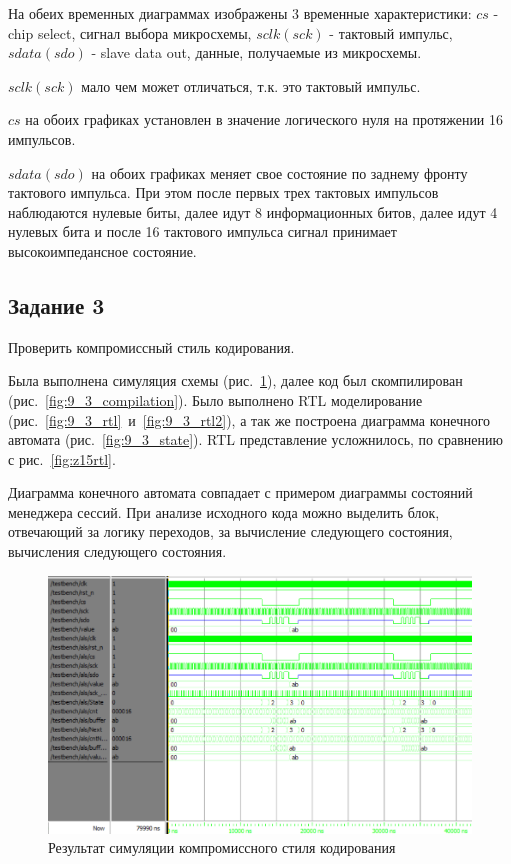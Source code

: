 \documentclass[a4paper,14pt]{article}
\begin{document}
	На обеих временных диаграммах изображены 3 временные характеристики: $cs$ - chip select, сигнал выбора микросхемы, $sclk(sck)$ - тактовый импульс, $sdata(sdo)$ - slave data out, данные, получаемые из микросхемы.
	
	$sclk(sck)$ мало чем может отличаться, т.к. это тактовый импульс.
	
	$cs$ на обоих графиках установлен в значение логического нуля на протяжении 16 импульсов.
	
	$sdata(sdo)$ на обоих графиках меняет свое состояние по заднему фронту тактового импульса. При этом после первых трех тактовых импульсов наблюдаются нулевые биты, далее идут 8 информационных битов, далее идут 4 нулевых бита и после 16 тактового импульса сигнал принимает высокоимпедансное состояние.
	
	\subsection{Задание 3}
	
	Проверить компромиссный стиль кодирования.
	
	Была выполнена симуляция схемы (рис.~\ref{fig:9_3_wave}), далее код был скомпилирован (рис.~\ref{fig:9_3_compilation}).
	Было выполнено RTL моделирование (рис.~\ref{fig:9_3_rtl}~и~\ref{fig:9_3_rtl2}), а так же построена диаграмма конечного автомата (рис.~\ref{fig:9_3_state}).
	RTL представление усложнилось, по сравнению с рис.~\ref{fig:z15rtl}.
	
	Диаграмма конечного автомата совпадает с примером диаграммы состояний менеджера сессий.
	При анализе исходного кода можно выделить блок, отвечающий за логику переходов, за вычисление следующего состояния, вычисления следующего состояния.
	
	\begin{figure}[H]
		\centering
		\includegraphics[width=0.9\linewidth]{images/9_3_wave}
		\caption{Результат симуляции компромиссного стиля кодирования}
		\label{fig:9_3_wave}
	\end{figure}
\end{document}
